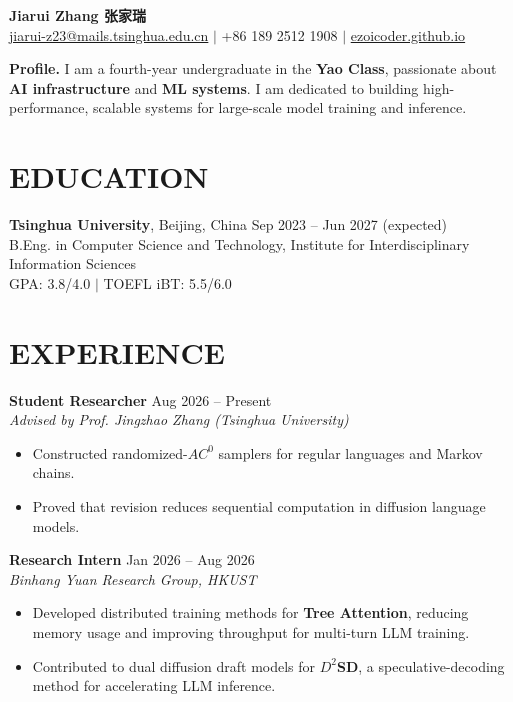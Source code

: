 \documentclass[11pt,a4paper]{article}
\newcommand{\entry}[4]{%
  \textbf{#1} \hfill {\small #2}\\[-1pt]
  \textit{#3} \hfill {\small\textit{#4}}%
}
\begin{document}
\begin{center}
  {\LARGE\bfseries\color{textgray} \latinGaramond Jiarui Zhang \;\textnormal{\large {张家瑞}}}\\[3pt]
  \href{mailto:jiarui-z23@mails.tsinghua.edu.cn}{jiarui-z23@mails.tsinghua.edu.cn}
  \quad $\vert$ \quad +86 189 2512 1908
  \quad $\vert$ \quad \href{https://ezoicoder.github.io}{ezoicoder.github.io}
\end{center}

\vspace{-3pt}
\textbf{Profile.} I am a fourth-year undergraduate in the \textbf{Yao Class}, passionate about \textbf{AI infrastructure} and \textbf{ML systems}. I am dedicated to building high-performance, scalable systems for large-scale model training and inference.

\section*{EDUCATION}
\textbf{Tsinghua University}, Beijing, China \hfill {\small Sep 2023 -- Jun 2027 (expected)}\\[-1pt]
B.Eng. in Computer Science and Technology, Institute for Interdisciplinary Information Sciences\\[-1pt]
GPA: 3.8/4.0 \quad $\vert$ \quad TOEFL iBT: 5.5/6.0

\section*{EXPERIENCE}

\entry{Student Researcher}{Aug 2026 -- Present}{Advised by Prof. Jingzhao Zhang (Tsinghua University)}{}
\begin{itemize}
  \item Constructed randomized-$AC^0$ samplers for regular languages and Markov chains.
  \item Proved that revision reduces sequential computation in diffusion language models.
\end{itemize}

\entry{Research Intern}{Jan 2026 -- Aug 2026}{Binhang Yuan Research Group, HKUST}{}
\begin{itemize}
  \item Developed distributed training methods for \textbf{Tree Attention}, reducing memory usage and improving throughput for multi-turn LLM training.
  \item Contributed to dual diffusion draft models for \textbf{$D^2$SD}, a speculative-decoding method for accelerating LLM inference.
\end{itemize}
\end{document}
